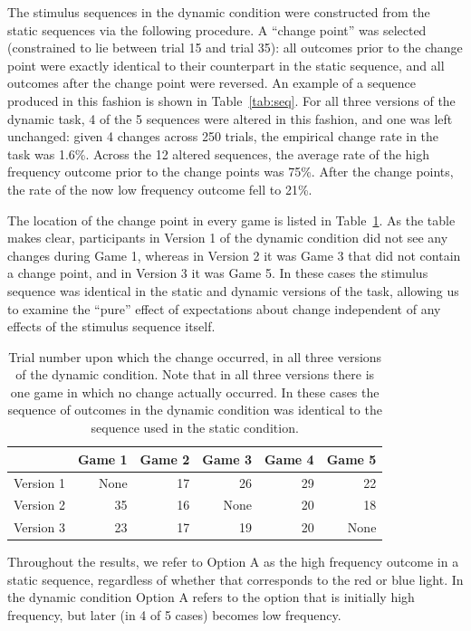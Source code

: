 \documentclass[authoryear]{elsarticle}
\begin{document}
The stimulus sequences in the dynamic condition were constructed from the static sequences via the following procedure. A ``change point'' was selected (constrained to lie between trial 15 and trial 35): all outcomes prior to the change point were exactly identical to their counterpart in the static sequence, and all outcomes after the change point were reversed. An example of a sequence produced in this fashion is shown in Table~\ref{tab:seq}. For all three versions of the dynamic task, 4 of the 5 sequences were altered in this fashion, and one was left unchanged: given 4 changes across 250 trials, the empirical change rate in the task was 1.6\%. Across the 12 altered sequences, the average rate of the high frequency outcome prior to the change points was 75\%. After the change points, the rate of the now low frequency outcome fell to 21\%.

The location of the change point in every game is listed in Table~\ref{tab:changepoints}. As the table makes clear, participants in Version 1 of the dynamic condition did not see any changes during Game 1, whereas in Version 2 it was Game 3 that did not contain a change point, and in Version 3 it was Game 5. In these cases the stimulus sequence was identical in the static and dynamic versions of the task, allowing us to examine the ``pure'' effect of expectations about change independent of any effects of the stimulus sequence itself.


\begin{table}[t]
\caption{Trial number upon which the change occurred, in all three versions of the dynamic condition. Note that in all three versions there is one game in which no change actually occurred. In these cases the sequence of outcomes in the dynamic condition was identical to the sequence used in the static condition.}
\label{tab:changepoints}
\footnotesize
\begin{center}
\begin{tabular}{l|rrrrr}
& Game 1 & Game 2 & Game 3 & Game 4 & Game 5 \\ \hline
Version 1 & None & 17 & 26 & 29 & 22 \\
Version 2 & 35 & 16 & None & 20 & 18 \\
Version 3 & 23 & 17 & 19 & 20 & None
\end{tabular}
\end{center}
\end{table}


Throughout the results, we refer to Option A as the high frequency outcome in a static sequence, regardless of whether that corresponds to the red or blue light. In the dynamic condition Option A refers to the option that is initially high frequency, but later (in 4 of 5 cases) becomes low frequency.
\end{document}
